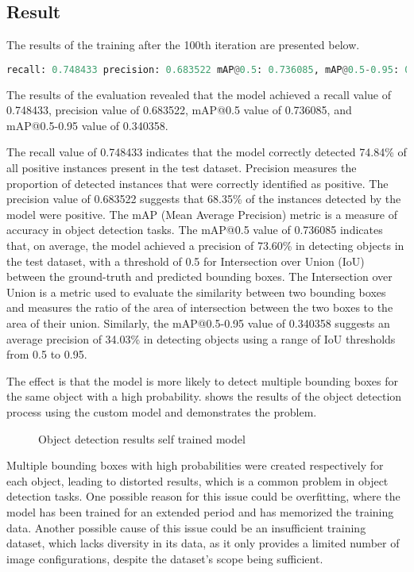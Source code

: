 \subsection{Result }

The results of the training after the 100th iteration are presented below.

\begin{lstlisting}[language=python]
    recall: 0.748433 precision: 0.683522 mAP@0.5: 0.736085, mAP@0.5-0.95: 0.340358
\end{lstlisting}

The results of the evaluation revealed that the model achieved a recall value of 0.748433, precision value of 0.683522, mAP@0.5 value of 0.736085, and mAP@0.5-0.95 value of 0.340358. 

The recall value of 0.748433 indicates that the model correctly detected 74.84\% of all positive instances present in the test dataset. Precision measures the proportion of detected instances that were correctly identified as positive. The precision value of 0.683522 suggests that 68.35\% of the instances detected by the model were positive. The mAP (Mean Average Precision) metric is a measure of accuracy in object detection tasks. The mAP@0.5 value of 0.736085 indicates that, on average, the model achieved a precision of 73.60\% in detecting objects in the test dataset, with a threshold of 0.5 for Intersection over Union (IoU) between the ground-truth and predicted bounding boxes. The Intersection over Union is a metric used to evaluate the similarity between two bounding boxes and measures the ratio of the area of intersection between the two boxes to the area of their union. Similarly, the mAP@0.5-0.95 value of 0.340358 suggests an average precision of 34.03\% in detecting objects using a range of IoU thresholds from 0.5 to 0.95. 

The effect is that the model is more likely to detect multiple bounding boxes for the same object with a high probability.  shows the results of the object detection process using the custom model and demonstrates the problem. 

\begin{figure}[!h]
    \centering
    \caption{Object detection results self trained model }
    \label{fig:trained_model_results}
\end{figure}

Multiple bounding boxes with high probabilities were created respectively for each object, leading to distorted results, which is a common problem in object detection tasks. One possible reason for this issue could be overfitting, where the model has been trained for an extended period and has memorized the training data. Another possible cause of this issue could be an insufficient training dataset, which lacks diversity in its data, as it only provides a limited number of image configurations, despite the dataset's scope being sufficient.

